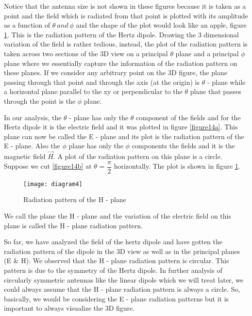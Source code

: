 Notice that the antenna size is not shown in these figures because it is taken as a point and the field which is radiated from that point is plotted with its amplitude as a function of $\theta \ and \ \phi$ and the shape of the plot would look like an apple, figure \ref{figure15}. This is the radiation pattern of the Hertz dipole. Drawing the 3 dimensional variation of the field is rather tedious, instead, the plot of the radiation pattern is taken across two sections of the 3D view on a principal $\theta$ plane and a principal $\phi$ plane where we essentially capture the information of the radiation pattern on these planes. If we consider any arbitrary point on the 3D figure, the plane passing through that point and through the axis (at the origin) is $\theta$ - plane while a horizontal plane parallel to the xy or perpendicular to the $\theta$ plane that passes through the point is the $\phi$ plane. 

In our analysis, the $\theta$ - plane has only the $\theta$ component of the fields and for the Hertz dipole it is the electric field and it was plotted in figure \ref{figure14a}. This plane can now be called the E - plane and its plot is the radiation pattern of the E - plane. Also the $\phi$ plane has only the $\phi$ components the fields and it is the magnetic field $\vec{H}$. A plot of the radiation pattern on this plane is a circle. Suppose we cut \ref{figure14b} at $\theta$ = $\dfrac{\pi}{2}$ horizontally. The plot is shown in figure \ref{figure15}.
\begin{figure}[h]
	\centering
	\texttt{[image: diagram4]}
	\caption{Radiation pattern of the H - plane}
	\label{figure15}
\end{figure}

We call the plane the H - plane and the variation of the electric field on this plane is called the H - plane radiation pattern. 

So far, we have analyzed the field of the hertz dipole and have gotten the radiation pattern of the dipole in the 3D view as well as in the principal planes (E \& H). We observed that the H - plane radiation pattern is circular. This pattern is due to the symmetry of the Hertz dipole. In further analysis of circularly symmetric antennas like the linear dipole which we will treat later, we could always assume that the H - plane radiation pattern is always a circle. So, basically, we would be considering the E - plane radiation patterns but it is important to always visualize the 3D figure.

